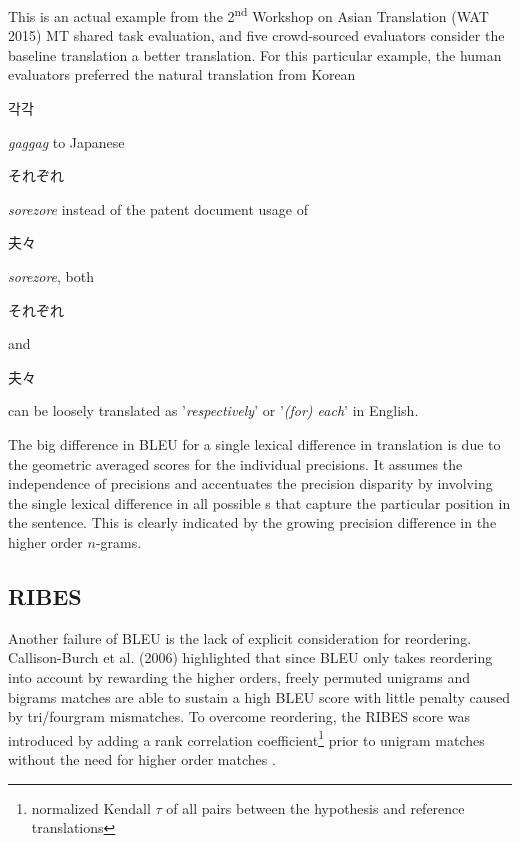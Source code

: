 	This is an actual example from the 2\textsuperscript{nd} Workshop on Asian Translation (WAT 2015) MT shared task evaluation, and five crowd-sourced evaluators consider the baseline translation a better translation. For this particular example, the human evaluators preferred the natural translation from Korean \begin{CJK*}{UTF8}{}\begin{korean}각각\end{korean}\end{CJK*} \emph{gaggag} to Japanese \begin{CJK*}{UTF8}{min}それぞれ\end{CJK*} \emph{sorezore} instead of the patent document usage of \begin{CJK*}{UTF8}{min}夫々\end{CJK*} \emph{sorezore}, both \begin{CJK*}{UTF8}{min}それぞれ\end{CJK*} and \begin{CJK*}{UTF8}{min}夫々\end{CJK*} can be loosely translated as '\emph{respectively}' or '\emph{(for) each}' in English.

The big difference in BLEU for a single lexical difference in translation is due to the geometric averaged scores for the individual \ngram{} precisions. It assumes the independence of \ngram{} precisions and accentuates the precision disparity by involving the single lexical difference in all possible \ngram{}s that capture the particular position in the sentence. This is clearly indicated by the growing precision difference in the higher order $n$-grams.

\subsection{RIBES}

Another failure of BLEU is the lack of explicit consideration for reordering. Callison-Burch et al. (2006) highlighted that since BLEU only takes reordering into account by rewarding the higher \ngram{} orders, freely permuted unigrams and bigrams matches are able to sustain a high BLEU score with little penalty caused by tri/fourgram mismatches. To overcome reordering, the RIBES score was introduced by adding a rank correlation coefficient\footnote{normalized Kendall $\tau$ of all \ngram{} pairs between the hypothesis and reference translations} prior to unigram matches without the need for higher order \ngram{} matches \citep{isozaki2010automatic}.

